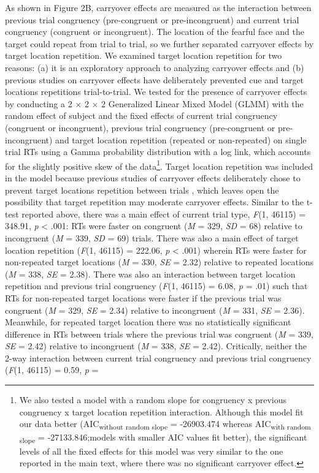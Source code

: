 \documentclass{article}
\begin{document}
	As shown in Figure 2B, carryover effects are measured as the interaction between previous trial congruency (pre-congruent or pre-incongruent) and current trial congruency (congruent or incongruent). The location of the fearful face and the target could repeat from trial to trial, so we further separated carryover effects by target location repetition. We examined target location repetition for two reasons: (a) it is an exploratory approach to analyzing carryover effects and (b) previous studies on carryover effects \parencite{Gladwin2019a} have deliberately prevented cue and target locations repetitions trial-to-trial. We tested for the presence of carryover effects by conducting a 2 × 2 × 2 Generalized Linear Mixed Model (GLMM) with the random effect of subject and the fixed effects of current trial congruency (congruent or incongruent), previous trial congruency (pre-congruent or pre-incongruent) and target location repetition (repeated or non-repeated) on single trial RTs using a Gamma probability distribution with a log link, which accounts for the slightly positive skew of the data\footnote{{\color{4472C4} }{\color{4472C4}We also tested a model with a random slope for congruency x previous congruency x target location repetition interaction. Although }{\color{4472C4}this}{\color{4472C4} model fit our data better (AIC}\textsubscript{{\color{4472C4}without random slope}}{\color{4472C4} = -26903.474 whereas AIC}\textsubscript{{\color{4472C4}with random slope}}{\color{4472C4} = -27133.846}{\color{4472C4};}{\color{4472C4}models with smaller AIC values fit better), the significant levels of all the fixed effect}{\color{4472C4}s}{\color{4472C4} for this model was very similar to the one reported in the main text, where there was no significant carryover effect.}}. Target location repetition was included in the model because previous studies of carryover effects deliberately chose to prevent target locations repetition between trials \parencite{Gladwin2019a}, which leaves open the possibility that target repetition may moderate carryover effects. Similar to the t-test reported above, there was a main effect of current trial type, \emph{F}(1, 46115) = 348.91, \emph{p }< .001: RTs were faster on congruent (\emph{M }= 329, \emph{SD}\emph{ }= 68) relative to incongruent (\emph{M }= 339, \emph{SD }= 69) trials. There was also a main effect of target location repetition (\emph{F}(1, 46115) = 222.06, \emph{p }< .001) wherein RTs were faster for non-repeated target locations (\emph{M }= 330, \emph{SE }= 2.32) relative to repeated locations (\emph{M }= 338, \emph{SE }= 2.38). There was also an interaction between target location repetition and previous trial congruency (\emph{F}(1, 46115) = 6.08, \emph{p }= .01) such that RTs for non-repeated target locations were faster if the previous trial was congruent (\emph{M }= 329, \emph{SE }= 2.34) relative to incongruent (\emph{M }= 331, \emph{SE }= 2.36). Meanwhile, for repeated target location there was no statistically significant difference in RTs between trials where the previous trial was congruent (\emph{M }= 339, \emph{SE }= 2.42) relative to incongruent (\emph{M }= 338, \emph{SE }= 2.42). Critically, neither the 2-way interaction between current trial congruency and previous trial congruency (\emph{F}(1, 46115) = 0.59, \emph{p }= 
\end{document}
